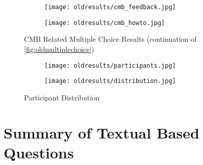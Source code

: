 \begin{figure}
    \hspace*{-1.5cm}
    \begin{subfigure}[h]{0.4\textwidth}
        \texttt{[image: oldresults/cmb\_feedback.jpg]}
        \caption{}
        \label{fig:cmb-feedback}
    \end{subfigure}
    \hfill
    \begin{subfigure}[h]{0.4\textwidth}
        \texttt{[image: oldresults/cmb\_howto.jpg]}
        \caption{}
        \label{fig:cmb-howto}
    \end{subfigure}
    \caption{CMB Related Multiple Choice Results (continuation of \ref{fig:oldmultiplechoice})}
    \label{fig:oldmultiplechoice1}
\end{figure}

\begin{figure}
    \hspace*{-1.5cm}
    \begin{subfigure}[h]{0.4\textwidth}
        \texttt{[image: oldresults/participants.jpg]}
        \caption{}
        \label{fig:distribution}
    \end{subfigure}
    \hfill
    \begin{subfigure}[h]{0.4\textwidth}
        \texttt{[image: oldresults/distribution.jpg]}
        \caption{}
        \label{fig:participants}
    \end{subfigure}
    \caption{Participant Distribution}
    \label{fig:oldsurvey-dist}
\end{figure}

\section{Summary of Textual Based Questions}
